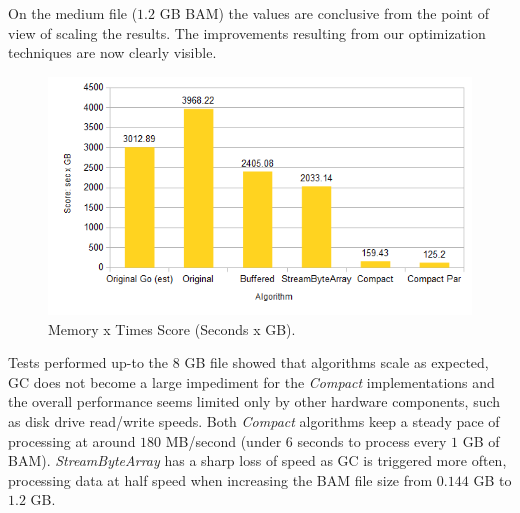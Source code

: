 \documentclass[a4paper,twoside]{article}
\begin{document}

On the medium file ($1.2$ GB BAM) the values are conclusive from the point of view of scaling the results. The improvements resulting from our optimization techniques are now clearly visible.
\begin{figure}[!h]
	\centering
	\includegraphics[scale=0.45]{images/times_and_memory_chart.png}
	
	\caption{Memory x Times Score (Seconds x GB).}
\end{figure}



%


Tests performed up-to the $8$ GB file showed that algorithms scale as expected, GC does not become a large impediment for the \textit{Compact} implementations and the overall performance seems limited only by other hardware components, such as disk drive read/write speeds.
Both \textit{Compact} algorithms keep a steady pace of processing at around $180$ MB/second (under $6$ seconds to process every $1$ GB of BAM). \textit{StreamByteArray} has a sharp loss of speed as GC is triggered more often, processing data at half speed when increasing the BAM file size from $0.144$ GB to $1.2$ GB.
\end{document}

